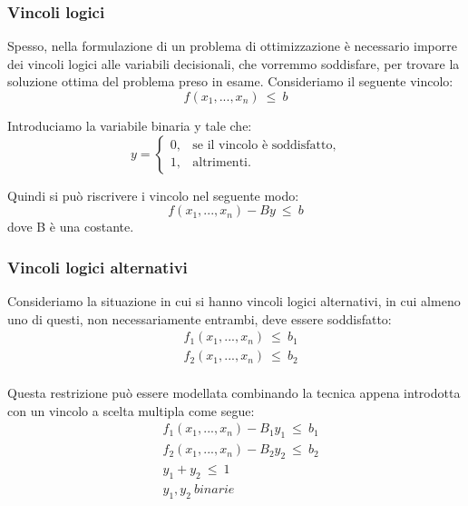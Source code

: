 \subsubsection*{Vincoli logici}
Spesso, nella formulazione di un problema di ottimizzazione è necessario imporre dei vincoli logici alle variabili decisionali, che vorremmo soddisfare, per trovare la soluzione ottima del problema preso in esame.
Consideriamo il seguente vincolo:
\begin{equation}
f(x_1,...,x_n) ~ \leq ~ b
\end{equation}

Introduciamo la variabile binaria y tale che:
\begin{equation}
\label{eq:varVincoloSoddisfatto}
y=
\begin{cases}
0, & \text{se il vincolo è soddisfatto,} \\
1, & \text{altrimenti.}
\end{cases}
\end{equation}

Quindi si può riscrivere i vincolo nel seguente modo:
\begin{equation}
f(x_1,...,x_n) - By ~ \leq ~ b
\end{equation}
dove B è una costante.

\subsubsection*{Vincoli logici alternativi}
Consideriamo la situazione in cui si hanno vincoli logici alternativi, in cui almeno uno di questi, non necessariamente entrambi, deve essere soddisfatto:
\begin{equation}
\begin{split}
& f_1{(x_1,...,x_n)} ~ \leq ~ b_1 \\
& f_2{(x_1,...,x_n)} ~ \leq ~ b_2 \\
\end{split}
\end{equation}

Questa restrizione può essere modellata combinando la tecnica appena introdotta con un vincolo a scelta multipla come segue:
\begin{equation}
\begin{split}
& f_1{(x_1,...,x_n)} - B_1y_1 ~ \leq ~ b_1 \\
& f_2{(x_1,...,x_n)} - B_2y_2 ~ \leq ~ b_2 \\
& y_1 + y_2 ~ \leq ~ 1 \\
& y_1, y_2 ~ binarie \\
\end{split}
\end{equation}

